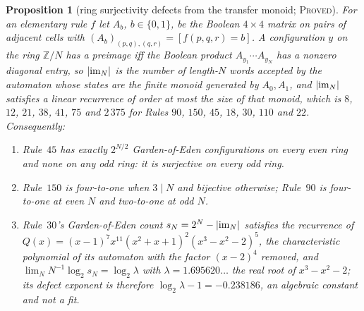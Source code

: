 \documentclass[11pt]{article}
\newtheorem{proposition}[theorem]{Proposition}
\theoremstyle{definition}
\theoremstyle{remark}
\newcommand{\Z}{\mathbb{Z}}
\newcommand{\PROVED}{\textsc{Proved}}
\begin{document}
\begin{proposition}[ring surjectivity defects from the transfer monoid; \PROVED]\label{du:prop:ringdefect}
For an elementary rule $f$ let $A_b$, $b\in\{0,1\}$, be the Boolean $4\times4$ matrix on pairs of adjacent
cells with $(A_b)_{(p,q),(q,r)}=[f(p,q,r)=b]$. A configuration $y$ on the ring $\Z/N$ has a preimage iff
the Boolean product $A_{y_1}\cdots A_{y_N}$ has a nonzero diagonal entry, so $|{\rm im}_N|$ is the number
of length-$N$ words accepted by the automaton whose states are the finite monoid generated by $A_0,A_1$,
and $|{\rm im}_N|$ satisfies a linear recurrence of order at most the size of that monoid, which is $8$,
$12$, $21$, $38$, $41$, $75$ and $2\,375$ for Rules $90$, $150$, $45$, $18$, $30$, $110$ and $22$.
Consequently:
\begin{enumerate}[nosep]
\item[(a)] Rule~$45$ has exactly $2^{N/2}$ Garden-of-Eden configurations on every even ring and none on
any odd ring: it is surjective on every odd ring.
\item[(b)] Rule~$150$ is four-to-one when $3\mid N$ and bijective otherwise; Rule~$90$ is four-to-one at
even $N$ and two-to-one at odd $N$.
\item[(c)] Rule~$30$'s Garden-of-Eden count $s_N=2^{N}-|{\rm im}_N|$ satisfies the recurrence of
$Q(x)=(x-1)^{7}x^{11}(x^{2}+x+1)^{2}(x^{3}-x^{2}-2)^{5}$, the characteristic polynomial of its automaton
with the factor $(x-2)^{4}$ removed, and $\lim_N N^{-1}\log_2 s_N=\log_2\lambda$ with
$\lambda=1.695620\ldots$ the real root of $x^{3}-x^{2}-2$; its defect exponent is therefore
$\log_2\lambda-1=-0.238186$, an algebraic constant and not a fit.
\end{enumerate}
\end{proposition}
\end{document}
